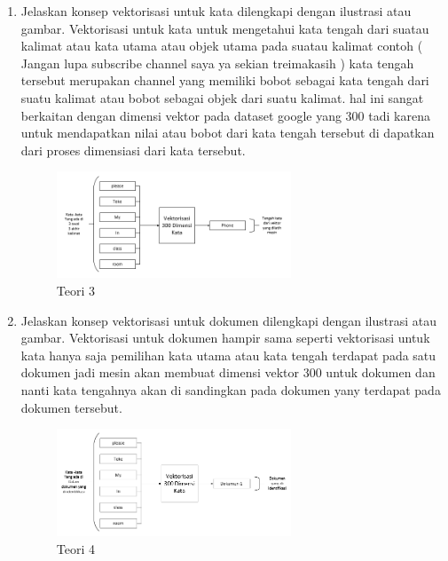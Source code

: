 \begin{enumerate}
	\item Jelaskan konsep vektorisasi untuk kata dilengkapi dengan ilustrasi atau gambar.
	\hfill\break
	Vektorisasi untuk kata untuk mengetahui kata tengah dari suatau kalimat atau kata utama atau objek utama pada suatau kalimat contoh ( Jangan lupa subscribe channel saya ya sekian treimakasih ) kata tengah tersebut merupakan channel yang memiliki bobot sebagai kata tengah dari suatu kalimat atau bobot sebagai objek dari suatu kalimat. hal ini sangat berkaitan dengan dimensi vektor pada dataset google yang 300 tadi karena untuk mendapatkan nilai atau bobot dari kata tengah tersebut di dapatkan dari proses dimensiasi dari kata tersebut. 
	\hfill\break
	\begin{figure}[H]
		\includegraphics[width=7cm]{figures/1174087/5/3.png}
		\centering
		\caption{Teori 3}
	\end{figure}

	\item Jelaskan konsep vektorisasi untuk dokumen dilengkapi dengan ilustrasi atau gambar.
	\hfill\break
	Vektorisasi untuk dokumen hampir sama seperti vektorisasi untuk kata hanya saja pemilihan kata utama atau kata tengah terdapat pada satu dokumen jadi mesin akan membuat dimensi vektor 300 untuk dokumen dan nanti kata tengahnya akan di sandingkan pada dokumen yany terdapat pada dokumen tersebut.
	\hfill\break
	\begin{figure}[H]
		\includegraphics[width=7cm]{figures/1174087/5/4.png}
		\centering
		\caption{Teori 4}
	\end{figure}


\end{enumerate}
